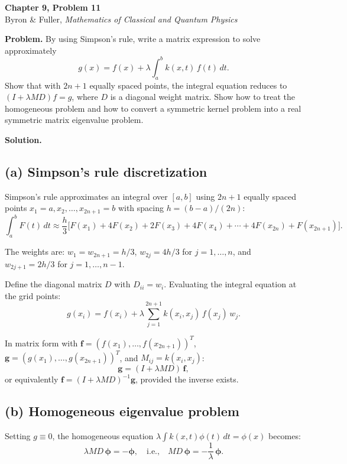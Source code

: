 \documentclass[12pt]{article}
\begin{document}
\begin{center}
{\Large\bfseries Chapter 9, Problem 11}\\[6pt]
Byron \& Fuller, \textit{Mathematics of Classical and Quantum Physics}
\end{center}

\bigskip

\textbf{Problem.} By using Simpson's rule, write a matrix expression to solve approximately
\[
g(x) = f(x) + \lambda \int_a^b k(x,t)\,f(t)\,dt.
\]
Show that with $2n+1$ equally spaced points, the integral equation reduces to $(I + \lambda MD)f = g$, where $D$ is a diagonal weight matrix. Show how to treat the homogeneous problem and how to convert a symmetric kernel problem into a real symmetric matrix eigenvalue problem.

\bigskip
\textbf{Solution.}

\subsection*{(a) Simpson's rule discretization}

Simpson's rule approximates an integral over $[a,b]$ using $2n+1$ equally spaced points $x_1 = a, x_2, \ldots, x_{2n+1} = b$ with spacing $h = (b-a)/(2n)$:
\[
\int_a^b F(t)\,dt \approx \frac{h}{3}\bigl[F(x_1) + 4F(x_2) + 2F(x_3) + 4F(x_4) + \cdots + 4F(x_{2n}) + F(x_{2n+1})\bigr].
\]

The weights are: $w_1 = w_{2n+1} = h/3$, $w_{2j} = 4h/3$ for $j = 1, \ldots, n$, and $w_{2j+1} = 2h/3$ for $j = 1, \ldots, n-1$.

Define the diagonal matrix $D$ with $D_{ii} = w_i$. Evaluating the integral equation at the grid points:
\[
g(x_i) = f(x_i) + \lambda \sum_{j=1}^{2n+1} k(x_i, x_j)\,f(x_j)\,w_j.
\]

In matrix form with $\mathbf{f} = (f(x_1), \ldots, f(x_{2n+1}))^T$, $\mathbf{g} = (g(x_1), \ldots, g(x_{2n+1}))^T$, and $M_{ij} = k(x_i, x_j)$:
\[
\boxed{\mathbf{g} = (I + \lambda M D)\,\mathbf{f}},
\]
or equivalently $\mathbf{f} = (I + \lambda MD)^{-1}\mathbf{g}$, provided the inverse exists.

\subsection*{(b) Homogeneous eigenvalue problem}

Setting $g \equiv 0$, the homogeneous equation $\lambda \int k(x,t)\phi(t)\,dt = \phi(x)$ becomes:
\[
\lambda MD\,\boldsymbol{\phi} = -\boldsymbol{\phi}, \quad \text{i.e.,} \quad MD\,\boldsymbol{\phi} = -\frac{1}{\lambda}\,\boldsymbol{\phi}.
\]
\end{document}
